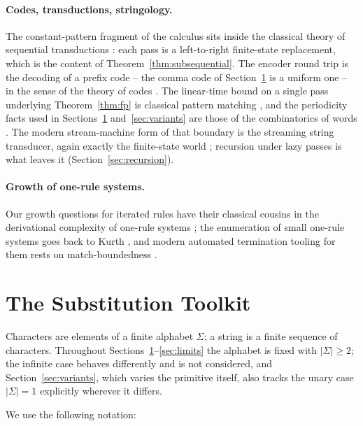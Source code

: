\documentclass[runningheads,envcountsect]{llncs}
\begin{document}
\paragraph{Codes, transductions, stringology.} The constant-pattern fragment of the calculus sits inside the classical theory of sequential transductions \cite{berstel79,elgot65}: each pass is a left-to-right finite-state replacement, which is the content of Theorem~\ref{thm:subsequential}. The encoder round trip is the decoding of a prefix code -- the comma code of Section~\ref{sec:toolkit} is a uniform one -- in the sense of the theory of codes \cite{berstel85,lothaire97}. The linear-time bound on a single pass underlying Theorem~\ref{thm:fp} is classical pattern matching \cite{knuth77,aho75}, and the periodicity facts used in Sections~\ref{sec:toolkit} and~\ref{sec:variants} are those of the combinatorics of words \cite{fine65,lothaire97}. The modern stream-machine form of that boundary is the streaming string transducer, again exactly the finite-state world \cite{alur10}; recursion under lazy passes is what leaves it (Section~\ref{sec:recursion}).

\paragraph{Growth of one-rule systems.} Our growth questions for iterated rules have their classical cousins in the derivational complexity of one-rule systems \cite{kobayashi01}; the enumeration of small one-rule systems goes back to Kurth \cite{kurth90,kurth96}, and modern automated termination tooling for them rests on match-boundedness \cite{geser04}.

\section{The Substitution Toolkit}
\label{sec:toolkit}

Characters are elements of a finite alphabet $\Sigma$; a string is a finite sequence of characters. Throughout Sections~\ref{sec:toolkit}--\ref{sec:limits} the alphabet is fixed with $|\Sigma| \ge 2$; the infinite case behaves differently and is not considered, and Section~\ref{sec:variants}, which varies the primitive itself, also tracks the unary case $|\Sigma| = 1$ explicitly wherever it differs.

We use the following notation:
\end{document}
